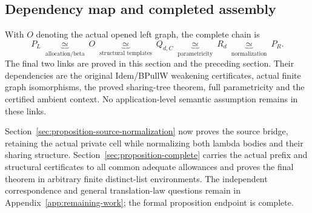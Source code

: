 \subsection{Dependency map and completed assembly}
With $O$ denoting the actual opened left graph, the complete chain is
\[
 P_L\ \underbrace{\simeq}_{\text{allocation/beta}}\ O
 \ \underbrace{\simeq}_{\text{structural templates}}\ Q_{d,C}
 \ \underbrace{\simeq}_{\text{parametricity}}\ R_d
 \ \underbrace{\simeq}_{\text{normalization}}\ P_R.
\]
The final two links are proved in this section and the preceding section.
Their dependencies are the original Idem/BPullW weakening certificates,
actual finite graph isomorphisms, the proved sharing-tree theorem, full
parametricity and the certified ambient context. No application-level semantic
assumption remains in these links.

Section~\ref{sec:proposition-source-normalization} now proves the source bridge,
retaining the actual private cell while normalizing both lambda bodies and
their sharing structure. Section~\ref{sec:proposition-complete} carries the
actual prefix and structural certificates to all common adequate allowances
and proves the final theorem in arbitrary finite distinct-list environments.
The independent correspondence and general translation-law questions remain
in Appendix~\ref{app:remaining-work}; the formal proposition endpoint is complete.
